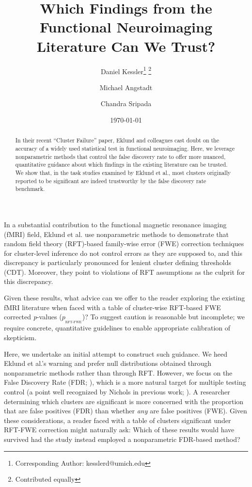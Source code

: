 \documentclass[letterpaper]{article}
\title{Which Findings from the Functional Neuroimaging Literature Can We Trust?}
\author{Daniel Kessler\thanks{Corresponding Author: kesslerd@umich.edu} \thanks{Contributed equally}}
\author{Michael Angstadt\samethanks}
\author{Chandra Sripada\samethanks}
\affil{Department of Psychiatry\\ University of Michigan, Ann Arbor}
\date{\today}
\newcommand{\subtext}[2]{
#1_{_{\text{#2}}}
}
\begin{document}
\maketitle

\begin{abstract}
In their recent ``Cluster Failure'' paper, Eklund and colleagues cast doubt on the accuracy of a widely used statistical test in functional neuroimaging. 
Here, we leverage nonparametric methods that control the false discovery rate to offer more nuanced, quantitative guidance about which findings in the existing literature can be trusted. 
We show that, in the task studies examined by Eklund et al., most clusters originally reported to be significant are indeed trustworthy by the false discovery rate benchmark.
\end{abstract}

In a substantial contribution to the functional magnetic resonance imaging (fMRI) field, Eklund et al. \cite{eklund16} use nonparametric methods to demonstrate that random field theory (RFT)-based family-wise error (FWE) correction techniques for cluster-level inference do not control errors as they are supposed to, and this discrepancy is particularly pronounced for lenient cluster defining thresholds (CDT). 
Moreover, they point to violations of RFT assumptions as the culprit for this discrepancy.

Given these results, what advice can we offer to the reader exploring the existing fMRI literature when faced with a table of cluster-wise RFT-based FWE corrected \textit{p}-values ($\subtext{p}{RFT-FWE}$)? 
To suggest caution is reasonable but incomplete; we require concrete, quantitative guidelines to enable appropriate calibration of skepticism.

Here, we undertake an initial attempt to construct such guidance.
We heed Eklund et al.'s warning and prefer null distributions obtained through nonparametric methods rather than through RFT.
However, we focus on the False Discovery Rate (FDR; \cite{fdr}), which is a more natural target for multiple testing control (a point well recognized by Nichols in previous work; \cite{genovese02}).
A researcher determining which clusters are significant is more concerned with the proportion that are false positives (FDR) than whether \textit{any} are false positives (FWE).
Given these considerations, a reader faced with a table of clusters significant under RFT-FWE correction might naturally ask: Which of these results would have survived had the study instead employed a nonparametric FDR-based method?
\end{document}
